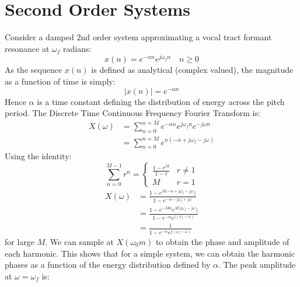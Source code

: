 \documentclass{article}
\begin{document}
\appendix

\section{Second Order Systems}
\label{sec:second_order}

Consider a damped 2nd order system approximating a vocal tract formant resonance at $\omega_f$ radians:
\begin{equation}
x(n) = e^{-\alpha n}e^{j \omega_f n} \quad n \ge 0
\end{equation}
As the sequence $x(n)$ is defined as analytical (complex valued), the magnitude as a function of time is simply:
\begin{equation}
|x(n)| = e^{-\alpha n}
\end{equation}
Hence $\alpha$ is a time constant defining the distribution of energy across the pitch period.  The Discrete Time Continuous Frequency Fourier Transform is:
\begin{equation}
\begin{split}
X(\omega) &= \sum_{n=0}^{n=M} e^{-\alpha n}e^{j \omega_f n}e^{-j \omega n} \\
           &= \sum_{n=0}^{n=M} e^{n(-\alpha + j \omega_f - j \omega)}
\end{split}
\end{equation}
Using the identity:
\begin{equation}
\label{eq:geo_sum}
\sum_{n=0}^{M-1} r^n = 
\begin{cases}
  \frac{1-r^M}{1-r} & r \ne 1 \\
   M                & r = 1 
\end{cases}   
\end{equation}
\begin{equation}
\label{eq:sec_order}
\begin{split}
X(\omega) &= \frac{1 - e^{M(-\alpha + j \omega_f - j \omega})}{1 - e^{-\alpha - j \omega_f + j \omega}} \\
          &= \frac{1 - e^{-M \alpha}e^{M( j \omega_f - j \omega})}{1 - e^{-\alpha}e^{ j( \omega_f - \omega)}} \\
           &= \frac{1}{1 - e^{-\alpha}e^{j (\omega_f - \omega)}}
\end{split}
\end{equation}
for large $M$.  We can sample at $X(\omega_0 m)$ to obtain the phase and amplitude of each harmonic. This shows that for a simple system, we can obtain the harmonic phases as a function of the energy distribution defined by $\alpha$.  The peak amplitude at $\omega=\omega_f$ is:
\end{document}

